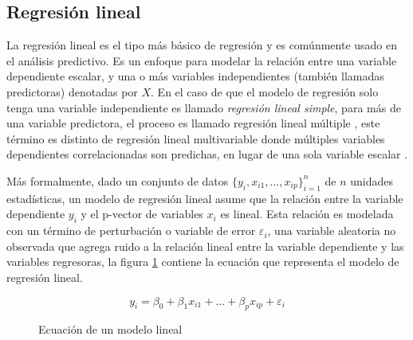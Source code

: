 \subsection{Regresión lineal}

La regresión lineal es el tipo más básico de regresión y es comúnmente usado en el análisis predictivo.
Es un enfoque para modelar la relación entre una variable dependiente escalar, y una o más variables independientes (también llamadas predictoras) denotadas por $X$. 
En el caso de que el modelo de regresión solo tenga una variable independiente es llamado \textit{regresión lineal simple}, para más de una variable predictora, el proceso es llamado regresión lineal múltiple \cite{DAFreedmanStatisticalModels}, este término es distinto de regresión lineal multivariable donde múltiples variables dependientes correlacionadas son predichas, en lugar de una sola variable escalar \cite{ACRencherWFChristensenMethods}.

Más formalmente, dado un conjunto de datos $\{y_i,x_{i1},...,x_{ip}\}_{i=1}^n$ de $n$ unidades estadísticas, un modelo de regresión lineal asume que la relación entre la variable dependiente $y_i$ y el p-vector de variables $x_i$ es lineal. Esta relación es modelada
con un término de perturbación o variable de error $\varepsilon_i$, una variable aleatoria no observada que agrega ruido a la relación lineal entre la variable dependiente y las variables regresoras, la figura \ref{ec:regresionLineal} contiene la ecuación que representa el modelo de regresión lineal.

\begin{figure}
\[ y_i= \beta_0 + \beta_1x_{i1} +...+ \beta_px_{ip} + \varepsilon_i \]
\caption{Ecuación de un modelo lineal}
\label{ec:regresionLineal}
\end{figure}

